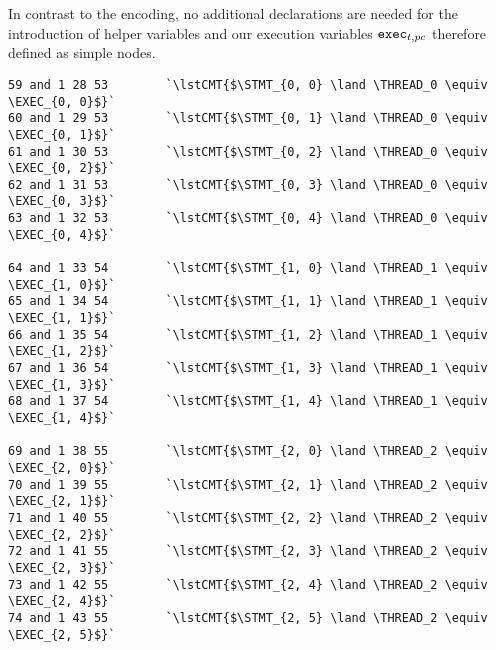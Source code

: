 \noindent
In contrast to the {\SMTLIB} encoding, no additional declarations are needed for the introduction of helper variables and our execution variables $\texttt{exec}_{t, pc}$ therefore defined as simple  nodes.
\begin{lstlisting}[style=btor2]
59 and 1 28 53        `\lstCMT{$\STMT_{0, 0} \land \THREAD_0 \equiv \EXEC_{0, 0}$}`
60 and 1 29 53        `\lstCMT{$\STMT_{0, 1} \land \THREAD_0 \equiv \EXEC_{0, 1}$}`
61 and 1 30 53        `\lstCMT{$\STMT_{0, 2} \land \THREAD_0 \equiv \EXEC_{0, 2}$}`
62 and 1 31 53        `\lstCMT{$\STMT_{0, 3} \land \THREAD_0 \equiv \EXEC_{0, 3}$}`
63 and 1 32 53        `\lstCMT{$\STMT_{0, 4} \land \THREAD_0 \equiv \EXEC_{0, 4}$}`

64 and 1 33 54        `\lstCMT{$\STMT_{1, 0} \land \THREAD_1 \equiv \EXEC_{1, 0}$}`
65 and 1 34 54        `\lstCMT{$\STMT_{1, 1} \land \THREAD_1 \equiv \EXEC_{1, 1}$}`
66 and 1 35 54        `\lstCMT{$\STMT_{1, 2} \land \THREAD_1 \equiv \EXEC_{1, 2}$}`
67 and 1 36 54        `\lstCMT{$\STMT_{1, 3} \land \THREAD_1 \equiv \EXEC_{1, 3}$}`
68 and 1 37 54        `\lstCMT{$\STMT_{1, 4} \land \THREAD_1 \equiv \EXEC_{1, 4}$}`

69 and 1 38 55        `\lstCMT{$\STMT_{2, 0} \land \THREAD_2 \equiv \EXEC_{2, 0}$}`
70 and 1 39 55        `\lstCMT{$\STMT_{2, 1} \land \THREAD_2 \equiv \EXEC_{2, 1}$}`
71 and 1 40 55        `\lstCMT{$\STMT_{2, 2} \land \THREAD_2 \equiv \EXEC_{2, 2}$}`
72 and 1 41 55        `\lstCMT{$\STMT_{2, 3} \land \THREAD_2 \equiv \EXEC_{2, 3}$}`
73 and 1 42 55        `\lstCMT{$\STMT_{2, 4} \land \THREAD_2 \equiv \EXEC_{2, 4}$}`
74 and 1 43 55        `\lstCMT{$\STMT_{2, 5} \land \THREAD_2 \equiv \EXEC_{2, 5}$}`
\end{lstlisting}

